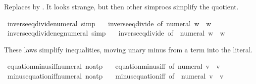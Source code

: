 \begin{isabellebody}
\begin{isamarkuptext}%
Replaces  by .  It looks
  strange, but then other simprocs simplify the quotient.%
\end{isamarkuptext}\isamarkuptrue%
\isamarkupfalse%
\ inverse{\isacharunderscore}{\kern0pt}eq{\isacharunderscore}{\kern0pt}divide{\isacharunderscore}{\kern0pt}numeral\ {\isacharbrackleft}{\kern0pt}simp{\isacharbrackright}{\kern0pt}\ {\isacharequal}{\kern0pt}\isanewline
\ \ inverse{\isacharunderscore}{\kern0pt}eq{\isacharunderscore}{\kern0pt}divide\ {\isacharbrackleft}{\kern0pt}of\ {\isachardoublequoteopen}numeral\ w{\isachardoublequoteclose}{\isacharbrackright}{\kern0pt}\ \ w\isanewline
\isanewline
{}\isamarkupfalse%
\ inverse{\isacharunderscore}{\kern0pt}eq{\isacharunderscore}{\kern0pt}divide{\isacharunderscore}{\kern0pt}neg{\isacharunderscore}{\kern0pt}numeral\ {\isacharbrackleft}{\kern0pt}simp{\isacharbrackright}{\kern0pt}\ {\isacharequal}{\kern0pt}\isanewline
\ \ inverse{\isacharunderscore}{\kern0pt}eq{\isacharunderscore}{\kern0pt}divide\ {\isacharbrackleft}{\kern0pt}of\ {\isachardoublequoteopen}{\isacharminus}{\kern0pt}\ numeral\ w{\isachardoublequoteclose}{\isacharbrackright}{\kern0pt}\ \ w%
\begin{isamarkuptext}%
These laws simplify inequalities, moving unary minus from a term
  into the literal.%
\end{isamarkuptext}\isamarkuptrue%
\isamarkupfalse%
\ equation{\isacharunderscore}{\kern0pt}minus{\isacharunderscore}{\kern0pt}iff{\isacharunderscore}{\kern0pt}numeral\ {\isacharbrackleft}{\kern0pt}no{\isacharunderscore}{\kern0pt}atp{\isacharbrackright}{\kern0pt}\ {\isacharequal}{\kern0pt}\isanewline
\ \ equation{\isacharunderscore}{\kern0pt}minus{\isacharunderscore}{\kern0pt}iff\ {\isacharbrackleft}{\kern0pt}of\ {\isachardoublequoteopen}numeral\ v{\isachardoublequoteclose}{\isacharbrackright}{\kern0pt}\ \ v\isanewline
\isanewline
{}\isamarkupfalse%
\ minus{\isacharunderscore}{\kern0pt}equation{\isacharunderscore}{\kern0pt}iff{\isacharunderscore}{\kern0pt}numeral\ {\isacharbrackleft}{\kern0pt}no{\isacharunderscore}{\kern0pt}atp{\isacharbrackright}{\kern0pt}\ {\isacharequal}{\kern0pt}\isanewline
\ \ minus{\isacharunderscore}{\kern0pt}equation{\isacharunderscore}{\kern0pt}iff\ {\isacharbrackleft}{\kern0pt}of\ {\isacharunderscore}{\kern0pt}\ {\isachardoublequoteopen}numeral\ v{\isachardoublequoteclose}{\isacharbrackright}{\kern0pt}\ \ v\isanewline

\end{isabellebody}

